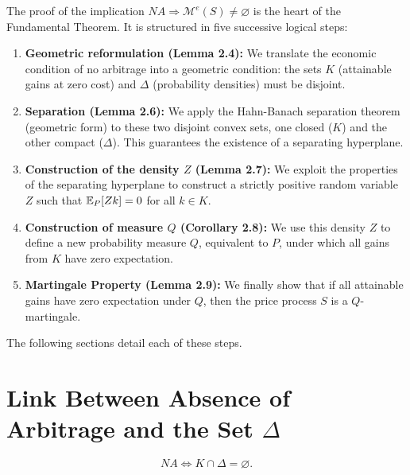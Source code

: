 \begin{tcolorbox}[title=Proof Strategy for FTAP (Direction $\Rightarrow$), colback=orange!5!white, colframe=orange!50!black]
The proof of the implication $NA \Rightarrow \mathcal{M}^e(S) \neq \varnothing$ is the heart of the Fundamental Theorem. It is structured in five successive logical steps:

\begin{enumerate}
    \item \textbf{Geometric reformulation (Lemma 2.4):} We translate the economic condition of no arbitrage into a geometric condition: the sets $K$ (attainable gains at zero cost) and $\Delta$ (probability densities) must be disjoint.
    \item \textbf{Separation (Lemma 2.6):} We apply the Hahn-Banach separation theorem (geometric form) to these two disjoint convex sets, one closed ($K$) and the other compact ($\Delta$). This guarantees the existence of a separating hyperplane.
    \item \textbf{Construction of the density $Z$ (Lemma 2.7):} We exploit the properties of the separating hyperplane to construct a strictly positive random variable $Z$ such that $\mathbb{E}_P[Zk] = 0$ for all $k \in K$.
    \item \textbf{Construction of measure $Q$ (Corollary 2.8):} We use this density $Z$ to define a new probability measure $Q$, equivalent to $P$, under which all gains from $K$ have zero expectation.
    \item \textbf{Martingale Property (Lemma 2.9):} We finally show that if all attainable gains have zero expectation under $Q$, then the price process $S$ is a $Q$-martingale.
\end{enumerate}
\end{tcolorbox}

The following sections detail each of these steps.

\section{Link Between Absence of Arbitrage and the Set $\Delta$}

\begin{lemma}
\begin{equation}
NA \Longleftrightarrow K \cap \Delta = \varnothing.
\end{equation}
\end{lemma}

